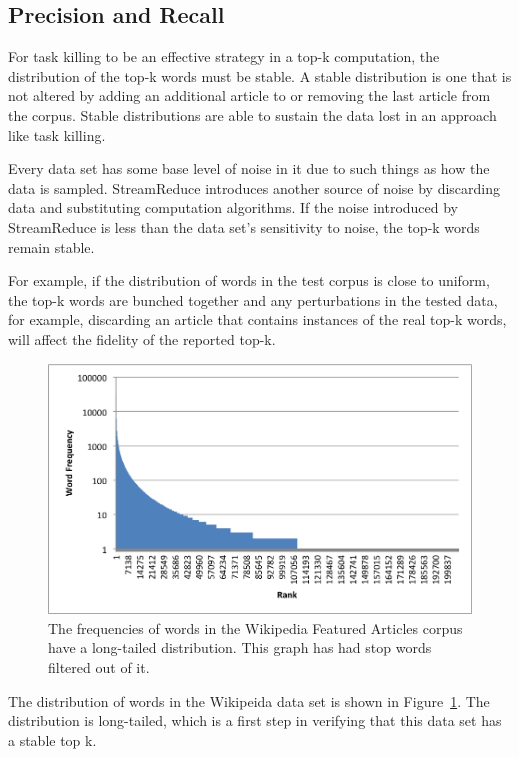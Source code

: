 \documentclass[12pt,twocolumn]{article}
\begin{document}
\subsection{Precision and Recall}
For task killing to be an effective strategy in a top-k computation,
the distribution of the top-k words must be stable. A stable distribution is one
that is not altered by adding an additional article to or removing the last
article from the corpus. Stable distributions are able to sustain the data lost in
an approach like task killing.

Every data set has some base level of noise in it due to such things as how the data is
sampled. StreamReduce introduces another source of noise by discarding data and
substituting computation algorithms. If the noise introduced by StreamReduce is less than
the data set's sensitivity to noise, the top-k words remain stable.

For example, if the distribution of words in the test corpus is close to uniform, the top-k
words are bunched together and any perturbations in the tested data, for example, discarding an
article that contains instances of the real top-k words, will affect the fidelity of the
reported top-k.

\begin{figure}
\includegraphics[width=\linewidth]{long-tail-ranks.png}
\caption{The frequencies of words in the Wikipedia Featured Articles corpus have a
long-tailed distribution. This graph has had stop words~\cite{stopwords} filtered out of it.}
\label{fig:wordDist}
\end{figure}

The distribution of words in the Wikipeida data set is
shown in Figure~\ref{fig:wordDist}. The distribution is long-tailed, which is a first step
in verifying that this data set has a stable top k.
\end{document}
